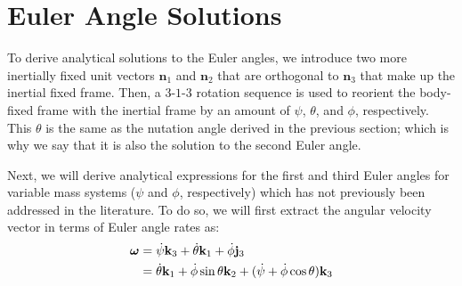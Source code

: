 \section{Euler Angle Solutions}
To derive analytical solutions to the Euler angles, we introduce two more inertially fixed unit vectors
$\mathbf{n}_1$ and $\mathbf{n}_2$ that are orthogonal to $\mathbf{n}_3$ that make up the inertial fixed frame.
Then, a $3$-$1$-$3$ rotation sequence is used to reorient the body-fixed frame with the inertial frame 
by an amount of $\psi$, $\theta$, and $\phi$, respectively. This $\theta$ is the same as the 
nutation angle derived in the previous section; which is why we say that it is also the
solution to the second Euler angle.

Next, we will derive analytical expressions for the first and third Euler angles for variable mass 
systems ($\psi$ and $\phi$, respectively) which has not previously been addressed in the literature. 
To do so, we will first extract the angular velocity vector in terms of Euler angle rates as:
\begin{equation}
\label{eq_euler_angles_omega_vms}
\begin{split}
\boldsymbol\omega &= \dot{\psi} {\bf k}_3 + \dot{\theta} {\bf k}_1 + \dot{\phi} {\bf j}_{3}\\
&= \dot{\theta} {\bf k}_1 + \dot{\phi} \sin \theta {\bf k}_{2} + (\dot{\psi} + \dot{\phi} \cos \theta) {\bf k}_3 
\end{split}
\end{equation}

